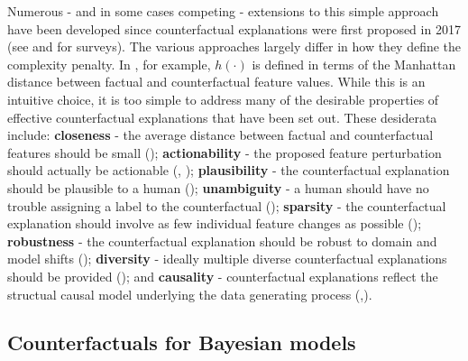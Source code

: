 \documentclass{juliacon}
\begin{document}
Numerous - and in some cases competing - extensions to this simple
approach have been developed since counterfactual explanations were
first proposed in 2017 (see \cite{verma2020counterfactual} and
\cite{karimi2020survey} for surveys). The various approaches largely
differ in how they define the complexity penalty. In
\cite{wachter2017counterfactual}, for example, \(h(\cdot)\) is defined
in terms of the Manhattan distance between factual and counterfactual
feature values. While this is an intuitive choice, it is too simple to
address many of the desirable properties of effective counterfactual
explanations that have been set out. These desiderata include:
\textbf{closeness} - the average distance between factual and
counterfactual features should be small
(\cite{wachter2017counterfactual}); \textbf{actionability} - the
proposed feature perturbation should actually be actionable
(\cite{ustun2019actionable}, \cite{poyiadzi2020face});
\textbf{plausibility} - the counterfactual explanation should be
plausible to a human (\cite{joshi2019towards}); \textbf{unambiguity} - a
human should have no trouble assigning a label to the counterfactual
(\cite{schut2021generating}); \textbf{sparsity} - the counterfactual
explanation should involve as few individual feature changes as possible
(\cite{schut2021generating}); \textbf{robustness} - the counterfactual
explanation should be robust to domain and model shifts
(\cite{upadhyay2021towards}); \textbf{diversity} - ideally multiple
diverse counterfactual explanations should be provided
(\cite{mothilal2020explaining}); and \textbf{causality} - counterfactual
explanations reflect the structual causal model underlying the data
generating process
(\cite{karimi2020algorithmic},\cite{karimi2021algorithmic}).

\hypertarget{counterfactuals-for-bayesian-models}{%
\subsection{Counterfactuals for Bayesian
models}\label{counterfactuals-for-bayesian-models}}
\end{document}
